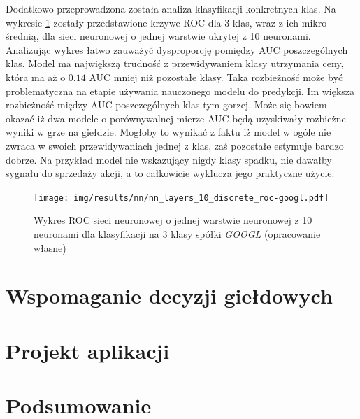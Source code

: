 \documentclass[a4paper, twoside, 11pt, openright]{article}
\begin{document}
Dodatkowo przeprowadzona została analiza klasyfikacji konkretnych klas. Na wykresie \ref{img:nn_layers_discrete} zostały przedstawione krzywe ROC dla 3 klas, wraz z ich mikro-średnią, dla sieci neuronowej o jednej warstwie ukrytej z 10 neuronami. Analizując wykres łatwo zauważyć dysproporcję pomiędzy AUC poszczególnych klas. Model ma największą trudność z przewidywaniem klasy utrzymania ceny, która ma aż o $0.14$ AUC mniej niż pozostałe klasy. Taka rozbieżność może być problematyczna na etapie używania nauczonego modelu do predykcji. Im większa rozbieżność między AUC poszczególnych klas tym gorzej. Może się bowiem okazać iż dwa modele o porównywalnej mierze AUC będą uzyskiwały rozbieżne wyniki w grze na giełdzie. Mogłoby to wynikać z faktu iż model w ogóle nie zwraca w swoich przewidywaniach jednej z klas, zaś pozostałe estymuje bardzo dobrze. Na przykład model nie wskazujący nigdy klasy spadku, nie dawałby sygnału do sprzedaży akcji, a to całkowicie wyklucza jego praktyczne użycie. 

\begin{figure}[H]
\centering \texttt{[image: img/results/nn/nn\_layers\_10\_discrete\_roc-googl.pdf]}
\caption{Wykres ROC sieci neuronowej o jednej warstwie neuronowej z 10 neuronami dla klasyfikacji na 3 klasy spółki \textit{GOOGL} (opracowanie własne)}
\label{img:nn_layers_discrete}
\end{figure}

\section{Wspomaganie decyzji giełdowych}

\section{Projekt aplikacji}

\section{Podsumowanie}


\newpage
\end{document}
